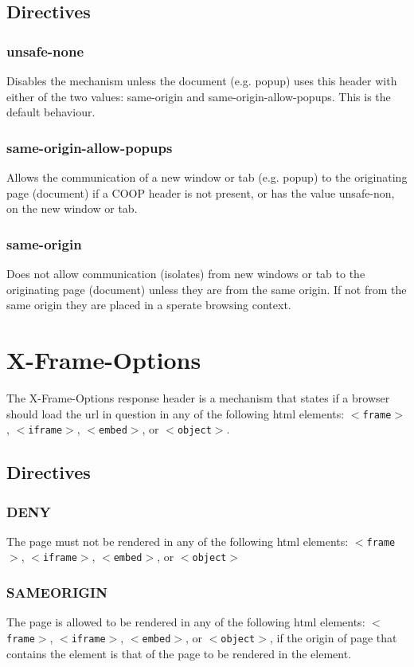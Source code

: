\documentclass{mscreport}
\begin{document}
\subsection{Directives}
\subsubsection{unsafe-none}
Disables the mechanism unless the document (e.g. popup) uses this header with either of the two values: same-origin and same-origin-allow-popups. This is the default behaviour.

\subsubsection{same-origin-allow-popups}
Allows the communication of a new window or tab (e.g. popup) to the originating page (document) if a COOP header is not present, or has the value unsafe-non, on the new window or tab.

\subsubsection{same-origin}
Does not allow communication (isolates) from new windows or tab to the originating page (document) unless they are from the same origin. If not from the same origin they are placed in a sperate browsing context.

\newpage

\section{X-Frame-Options}
The X-Frame-Options response header is a mechanism that states if a browser should load the url in question in any of the following html elements: \texttt{$<$frame$>$}, \texttt{$<$iframe$>$}, \texttt{$<$embed$>$}, or \texttt{$<$object$>$}.

\subsection{Directives}
\subsubsection{DENY}
The page must not be rendered in any of the following html elements: \texttt{$<$frame$>$}, \texttt{$<$iframe$>$}, \texttt{$<$embed$>$}, or \texttt{$<$object$>$}

\subsubsection{SAMEORIGIN}
The page is allowed to be rendered in any of the following html elements: \texttt{$<$frame$>$}, \texttt{$<$iframe$>$}, \texttt{$<$embed$>$}, or \texttt{$<$object$>$}, if the origin of page that contains the element is that of the page to be rendered in the element.
\end{document}
